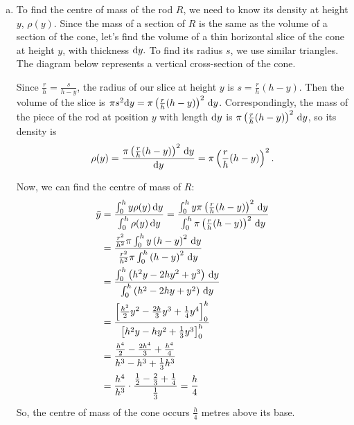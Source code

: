 \begin{solution}
\begin{enumerate}[(a)]
\item To find the centre of mass of the rod $R$, we need to know its density at height $y$, $\rho(y)$. Since the mass of a section of $R$ is the same as the volume of a section of the cone, let's find the volume of a thin horizontal slice of the cone at height $y$, with thickness $\mathrm{d}y.$ To find its radius $s$, we use similar triangles. The diagram below represents a vertical cross-section of the cone.

\begin{center}
\end{center}

Since $\frac{r}{h}=\frac{s}{h-y}$, the radius of our slice at height $y$ is $s=\frac{r}{h}(h-y)$. Then the volume of the slice is $\pi s^2\mathrm{d}y=\pi\left(\frac{r}{h}(h-y)\right)^2\,\mathrm{d}y$. Correspondingly, the mass of the piece of the rod at position $y$ with length $\mathrm{d}y$ is $\pi\left(\frac{r}{h}(h-y)\right)^2\,\mathrm{d}y$, so its density is
\[\rho(y) = \frac{\pi\left(\frac{r}{h}(h-y)\right)^2\,\mathrm{d}y}{\mathrm{d}y}=\pi\left(\frac{r}{h}(h-y)\right)^2.\]

Now, we can find the centre of mass of $R$:
\begin{align*}
\bar y &= \frac{\int_0^h y\rho(y)\,\mathrm{d}y}{\int_0^h \rho(y)\,\mathrm{d}y} =
\frac{\int_0^h y\pi\left(\frac{r}{h}(h-y)\right)^2\,\mathrm{d}y}{\int_0^h \pi\left(\frac{r}{h}(h-y)\right)^2\,\mathrm{d}y}\\
& =
\frac{\frac{r^2}{h^2}\pi\int_0^h y\left(h-y\right)^2\,\mathrm{d}y}{\frac{r^2}{h^2}\pi\int_0^h \left(h-y\right)^2\,\mathrm{d}y}\\& =
\frac{\int_0^h \left(h^2y-2hy^2+y^3\right)\,\mathrm{d}y}{\int_0^h \left(h^2-2hy+y^2\right)\,\mathrm{d}y}\\
&=\frac{\left[\frac{h^2}{2}y^2-\frac{2h}{3}y^3+\frac{1}{4}y^4\right]_0^h}
{\left[h^2y-hy^2+\frac{1}{3}y^3\right]_0^h}
\\&=\frac{\frac{h^4}{2}-\frac{2h^4}{3}+\frac{h^4}{4}}
{h^3-h^3+\frac{1}{3}h^3}\\
&=\frac{h^4}{h^3}\cdot\frac{\frac{1}{2}-\frac{2}{3}+\frac{1}{4}}{\frac{1}{3}}=\frac{h}{4}
\end{align*}
So, the centre of mass of the cone occurs $\frac{h}{4}$ metres above its base.


\end{enumerate}
\end{solution}
